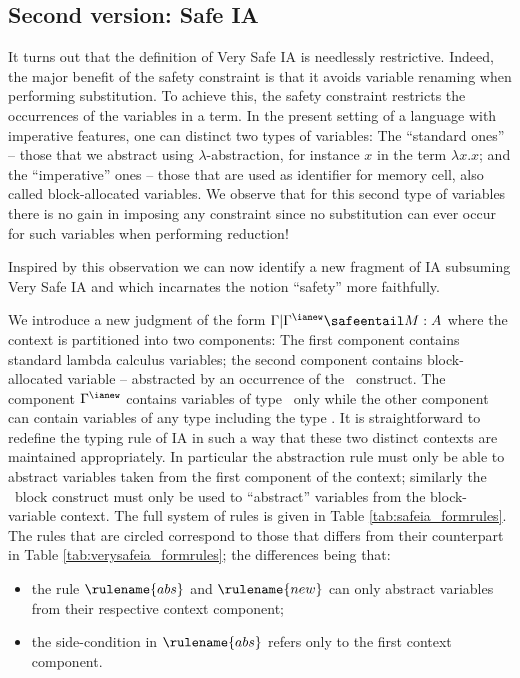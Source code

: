 

\subsection{Second version: Safe IA}

It turns out that the definition of Very Safe IA is needlessly
restrictive. Indeed, the major benefit of the safety constraint is
that it avoids variable renaming when performing substitution. To
achieve this, the safety constraint restricts the occurrences of the
variables in a term. In the present setting of a language with
imperative features, one can distinct two types of variables: The
``standard ones'' -- those that we abstract using
$\lambda$-abstraction, for instance $x$ in the term $\lambda x . x$;
and the ``imperative'' ones -- those that are used as identifier for
memory cell, also called block-allocated variables. We observe that
for this second type of variables there is no gain in imposing any
constraint since no substitution can ever occur for such variables
when performing reduction!

Inspired by this observation we can now identify a new fragment of
IA subsuming Very Safe IA and which incarnates the notion ``safety''
 more faithfully.

We introduce a new judgment of the form $\Gamma | \Gamma^{\ianew}
\safeentail M : A$ where the context is partitioned into two
components: The first component contains standard lambda calculus
variables; the second component contains block-allocated variable --
abstracted by an occurrence of the \ianew\ construct. The component
$\Gamma^{\ianew}$ contains variables of type \iavar\ only while the
other component can contain variables of any type including the type
\iavar. It is straightforward to redefine the typing rule of IA in
such a way that these two distinct contexts are maintained
appropriately. In particular the abstraction rule must only be able
to abstract variables taken from the first component of the context;
similarly the \ianew\ block construct must only be used to
``abstract'' variables from the block-variable context. The full
system of rules is given in Table \ref{tab:safeia_formrules}. The
rules that are circled correspond to those that differs from their
counterpart in Table \ref{tab:verysafeia_formrules}; the differences
being that:
\begin{itemize}
\item the rule $\rulename{abs}$ and $\rulename{new}$ can only
abstract variables from their respective context component;
\item the side-condition in $\rulename{abs}$ refers only to
the first context component.
\end{itemize}

